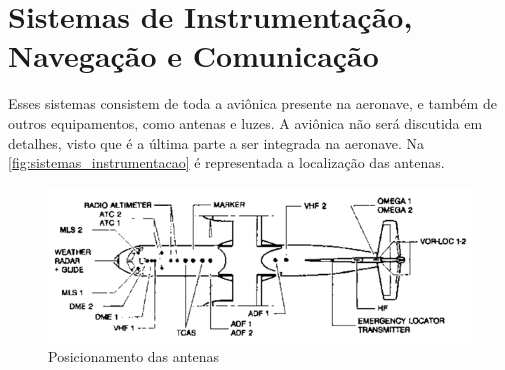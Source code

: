 \section{Sistemas de Instrumentação, Navegação e Comunicação}

Esses sistemas consistem de toda a aviônica presente na aeronave, e também de outros equipamentos, como antenas e luzes.
A aviônica não será discutida em detalhes, visto que é a última parte a ser integrada na aeronave.
Na \autoref{fig:sistemas_instrumentacao} é representada a localização das antenas.

\begin{figure}
\includegraphics[width=\textwidth]{images/parte3/sistemas_instrumentacao.png}
\caption{Posicionamento das antenas}
\label{fig:sistemas_instrumentacao}
\end{figure}
